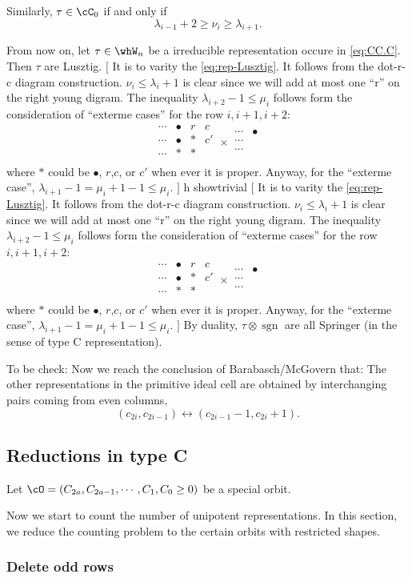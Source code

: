 \documentclass[12pt,a4paper]{amsart}
\newcommand{\trivial}[2][]{\if\relax\detokenize{#1}\relax
  {%
      \color{orange} \vspace{0em} $[$  #2 $]$
      \color{black}
  }
  \else
\ifx#1h
\ifcsname showtrivial\endcsname
{%
    \color{orange} \vspace{0em}  $[$ #2 $]$
    \color{black}
}
\fi
\else {\red Wrong argument!} \fi
\fi
}
\newcommand{\sgn}{\operatorname{sgn}}
\numberwithin{equation}{section}
\theoremstyle{remark}
\begin{document}
  Similarly, $\tau \in \cC_0$ if and only if
  \[
    \lambda_{i-1}+2 \geq \nu_i \geq \lambda_{i+1}.
  \]

  From now on, let $\tau\in \whW_n$ be a irreducible representation occure in
  \eqref{eq:CC.C}.  Then $\tau$ are Lusztig.  \trivial{ It is to varity the
    \eqref{eq:rep-Lusztig}.  It follows from the dot-r-c diagram construction.
    $\nu_i\leq \lambda_{i}+1$ is clear since we will add at most one ``r'' on
    the right young digram.  The inequality $\lambda_{i+2}-1\leq\mu_i$ follows
    form the consideration of ``exterme cases'' for the row $i,i+1,i+2$:
    \[
      \begin{matrix}
        \cdots & \bullet & r & c\\
        \cdots & \bullet & * & c'\\
        \cdots &  * & *\\
      \end{matrix}
      \times
      \begin{matrix}
        \cdots & \bullet\\
        \cdots\\
        \cdots\\
      \end{matrix}
    \]
    where $*$ could be $\bullet$, $r$,$c$, or $c'$ when ever it is proper.
    Anyway, for the ``exterme case'', $\lambda_{i+1} -1 = \mu_i+1-1 \leq \mu_i$.
  } By duality, $\tau\otimes \sgn$ are all Springer (in the sense of type C
  representation).

  {\color{red} To be check:} Now we reach the conclusion of Barabasch/McGovern
  that: The other representations in the primitive ideal cell are obtained by
  interchanging pairs coming from even columns,
  \begin{equation}
    \label{eq:wccell}
    (c_{2i}, c_{2i-1})\longleftrightarrow (c_{2i-1}-1,c_{2i}+1).  
  \end{equation}
  \subsection{Reductions in type C}
  Let $\cO = (C_{2a}, C_{2a-1}, \cdots, C_{1}, C_{0}\geq 0)$ be a special orbit.

  Now we start to count the number of unipotent representations.  In this
  section, we reduce the counting problem to the certain orbits with restricted
  shapes.

  \subsubsection{Delete odd rows}
\end{document}
